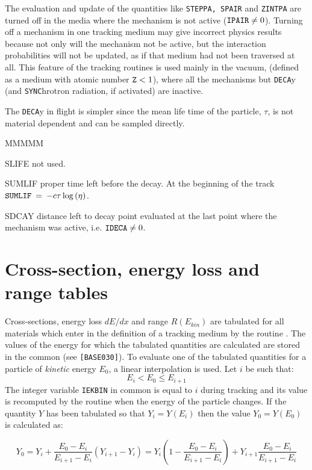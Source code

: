 The evaluation and update of the quantities like {\tt STEPPA, SPAIR} and
{\tt ZINTPA} are turned off in the media where the mechanism is not
active ($\mbox{\tt IPAIR} \neq 0$). Turning off a mechanism in one 
tracking medium may give incorrect physics results because
not only will the mechanism not be active, but the interaction
probabilities will not be updated, as if that medium had not been
traversed at all. This
feature of the tracking routines is used mainly in the vacuum, (defined
as a medium with atomic number $\mbox{\tt Z} < 1$), where all the mechanisms
but {\tt DECA}y (and {\tt SYNC}hrotron radiation, if activated) are inactive.
 
The {\tt DECA}y in flight is simpler since the mean life time of
the particle, $\tau$, is not material dependent and can be
sampled directly.
\begin{DLtt}{MMMMM}
\item[SLIFE] not used.
\item[SUMLIF] proper time left before the decay. At the beginning of the
track $\mbox{\tt SUMLIF} \: = \: -c\tau \log \left  ( \eta \right )$.
\item[SDCAY] distance left to decay point evaluated at the last point
where the mechanism was active, i.e. $\mbox{\tt IDECA} \neq 0$.
\end{DLtt}
 
\section {Cross-section, energy loss and range tables}
Cross-sections, energy loss $dE/dx$ and range $R(E_{kin})$
are tabulated for all materials which enter in the definition of
a tracking medium by the routine .
The values of the energy for which the tabulated quantities are calculated
are stored in the common  (see {\tt [BASE030]}).
To evaluate one of the tabulated quantities for a particle of {\it kinetic}
energy $E_0$, a linear interpolation is used. Let $i$ be such that:
\[
E_i  < E_0 \leq E_{i+1}
\]
The integer variable
{\tt IEKBIN} in common  is equal to $i$ during
tracking and its value is recomputed by the routine  when
the energy of the particle changes. If the quantity $Y$ has been tabulated
so that $Y_i = Y(E_i)$ then the value $Y_0 = Y(E_0)$ is calculated as:

\begin{equation}
Y_0 = 
Y_i + \frac{E_0-E_i}{E_{i+1}-E_i} \left( Y_{i+1}-Y_i \right)
=  Y_i 
\left ( 1 - \frac{E_0-E_i}{E_{i+1}-E_i} \right ) +
Y_{i+1} \frac{E_0-E_i}{E_{i+1}-E_i}
\end{equation}


